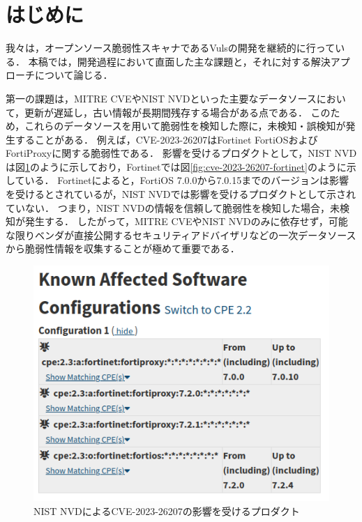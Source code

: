 \section{はじめに}

我々は，オープンソース脆弱性スキャナであるVuls\cite{vuls}の開発を継続的に行っている．
本稿では，開発過程において直面した主な課題と，それに対する解決アプローチについて論じる．

第一の課題は，MITRE CVE\cite{mitre-cve}やNIST NVD\cite{nist-nvd}といった主要なデータソースにおいて，更新が遅延し，古い情報が長期間残存する場合がある点である．
このため，これらのデータソースを用いて脆弱性を検知した際に，未検知・誤検知が発生することがある．
例えば，CVE-2023-26207はFortinet FortiOSおよびFortiProxyに関する脆弱性である．
影響を受けるプロダクトとして，NIST NVDは図\ref{fig:cve-2023-26207-nvd}のように示しており，Fortinetでは図\ref{fig:cve-2023-26207-fortinet}のように示している．
Fortinetによると，FortiOS 7.0.0から7.0.15までのバージョンは影響を受けるとされているが，NIST NVDでは影響を受けるプロダクトとして示されていない．
つまり，NIST NVDの情報を信頼して脆弱性を検知した場合，未検知が発生する．
したがって，MITRE CVEやNIST NVDのみに依存せず，可能な限りベンダが直接公開するセキュリティアドバイザリなどの一次データソースから脆弱性情報を収集することが極めて重要である．

\begin{figure}[htbp]
    \begin{center}
            \includegraphics[scale=0.5]{./1-introduction/cve-2023-26207-nvd.png}
            \caption{NIST NVDによるCVE-2023-26207の影響を受けるプロダクト\cite{cve-2023-26207-nvd}}
            \label{fig:cve-2023-26207-nvd}
    \end{center}
\end{figure}


